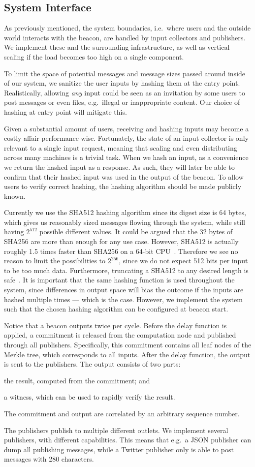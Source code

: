 \subsection{System Interface}%
\label{sub:system_interface}
As previously mentioned, the system boundaries, i.e.\ where users and the outside world interacts with the beacon, are handled by input collectors and publishers.
We implement these and the surrounding infrastructure, as well as vertical scaling if the load becomes too high on a single component.

To limit the space of potential messages and message sizes passed around inside of our system, we sanitize the user inputs by hashing them at the entry point. Realistically, allowing \emph{any} input could be seen as an invitation by some users to post messages or even files, e.g.\ illegal or inappropriate content. Our choice of hashing at entry point will mitigate this.

Given a substantial amount of users, receiving and hashing inputs may become a costly affair performance-wise.
Fortunately, the state of an input collector is only relevant to a single input request, meaning that scaling and even distributing across many machines is a trivial task.
When we hash an input, as a convenience we return the hashed input as a response. As such, they will later be able to confirm that their hashed input was used in the output of the beacon.
To allow users to verify correct hashing, the hashing algorithm should be made publicly known.

Currently we use the SHA512 hashing algorithm since its digest size is 64 bytes, which gives us reasonably sized messages flowing through the system, while still having $2^{512}$ possible different values. It could be argued that the 32 bytes of SHA256 are more than enough for any use case. However, SHA512 is actually roughly 1.5 times faster than SHA256 on a 64-bit CPU~\cite{sha512faster}. Therefore we see no reason to limit the possibilities to $2^{256}$, since we do not expect 512 bits per input to be too much data. Furthermore, truncating a SHA512 to any desired length is safe~\cite{sha512faster}.
It is important that the same hashing function is used throughout the system, since differences in output space will bias the outcome if the inputs are hashed multiple times --- which is the case.
However, we implement the system such that the chosen hashing algorithm can be configured at beacon start.

Notice that a beacon outputs twice per cycle. Before the delay function is applied, a commitment is released from the computation node and published through all publishers. Specifically, this commitment contains all leaf nodes of the Merkle tree, which corresponds to all inputs. After the delay function, the output is sent to the publishers. The output consists of two parts:
\begin{eletterate*}
    \item the result, computed from the commitment; and
    \item a witness, which can be used to rapidly verify the result.
\end{eletterate*}
The commitment and output are correlated by an arbitrary sequence number.

The publishers publish to multiple different outlets.
We implement several publishers, with different capabilities.
This means that e.g.\ a JSON publisher can dump all publishing messages, while a Twitter publisher only is able to post messages with 280 characters.
